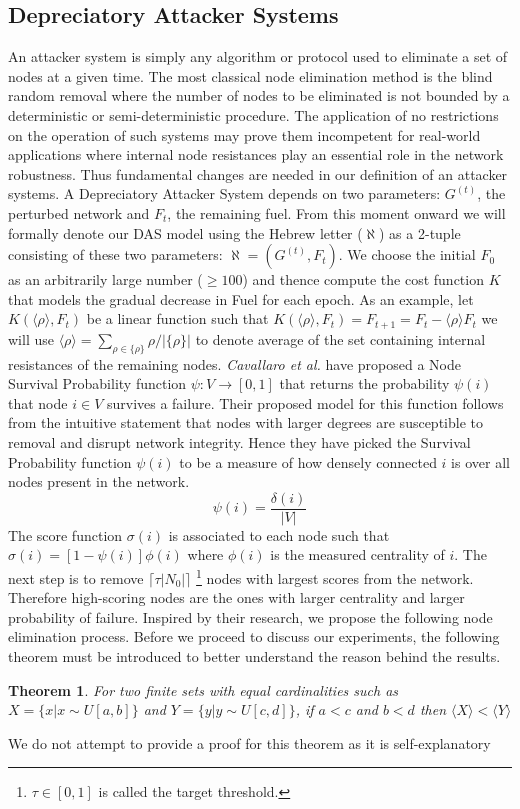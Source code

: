 \documentclass{article}
\begin{document}
	\subsection{Depreciatory Attacker Systems}
	An attacker system is simply any algorithm or protocol used to eliminate a set of nodes at a given time. The most classical node elimination method is the blind random removal where the number of nodes to be eliminated is not bounded by a deterministic or semi-deterministic procedure. The application of no restrictions on the operation of such systems may prove them incompetent for real-world applications where internal node resistances play an essential role in the network robustness. Thus fundamental changes are needed in our definition of an attacker systems. A Depreciatory Attacker System depends on two parameters: $G^{(t)}$, the perturbed network and $F_{t}$, the remaining fuel. From this moment onward we will formally denote our DAS model using the Hebrew letter ($\aleph$) as a 2-tuple consisting of these two parameters:
	$\aleph =(G^{(t)},F_t)$. We choose the initial $F_0$ as an arbitrarily large number ($ \geq 100$) and thence compute the cost function $K$ that models the gradual decrease in Fuel for each epoch. As an example, let $K(\langle \rho \rangle,F_{t})$ be a linear function such that $K(\langle \rho \rangle,F_{t})= F_{t+1} = F_{t} - \langle \rho \rangle F_{t}$ we will use $\langle \rho \rangle = \sum_{\rho \in \{ \rho \}}\rho/| \{ \rho \}|$ to denote average of the set containing internal resistances of the remaining nodes.
	\textit{Cavallaro et al.}\cite{ProbabNodeFailure} have proposed a Node Survival Probability function $\psi:V\rightarrow [0,1]$ that returns the probability $\psi(i)$ that node $i\in V$ survives a failure. Their proposed model for this function follows from the intuitive statement that nodes with larger degrees are susceptible to removal and disrupt network integrity. Hence they have picked the Survival Probability function $\psi(i)$ to be a measure of how densely connected $i$ is over all nodes present in the network.
	\begin{equation*}
		\psi(i) = \frac{\delta(i)}{|V|}
	\end{equation*}
	The score function $\sigma(i)$ is associated to each node such that $\sigma(i) = [1-\psi(i)]\phi(i)$ where $\phi(i)$ is the measured centrality of $i$. The next step is to remove $\lceil \tau|N_0| \rceil$ \footnote{$\tau \in [0,1]$ is called the target threshold.} nodes with largest scores from the network. Therefore high-scoring nodes are the ones with larger centrality and larger probability of failure. Inspired by their research, we propose the following node elimination process. Before we proceed to discuss our experiments, the following theorem must be introduced to better understand the reason behind the results.
	\newtheorem{thm}{Theorem}
	\begin{thm}\label{disttheorem}
		For two finite sets with equal cardinalities such as $X=\{x|x\sim U[a,b]\}$ and $Y=\{y|y\sim U[c,d]\}$, if $a<c$ and $b<d$ then $\langle X\rangle < \langle Y\rangle $
	\end{thm}
	We do not attempt to provide a proof for this theorem as it is self-explanatory
\end{document}

